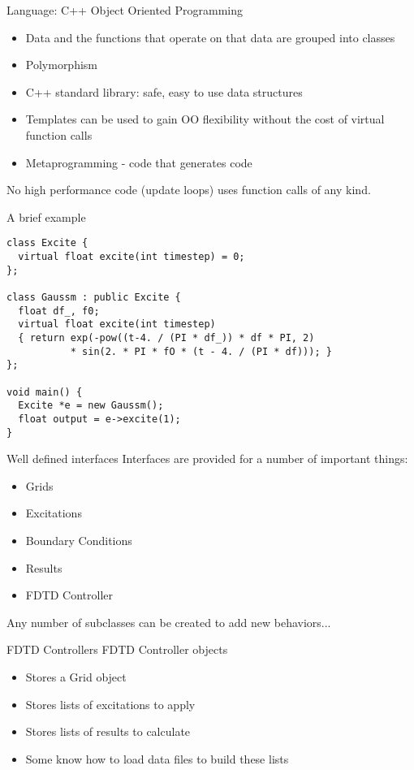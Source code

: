 \documentclass[pdf, nototal, slideBW]{prosper}
\newcommand{\insgraphic}[2]{
  \begin{center}
    \scalebox{#1}{
      \texttt{[image: \#2]}
    }
  \end{center}
}
\begin{document}
\begin{slide}{Language: C++}
  Object Oriented Programming
  \begin{itemize}
  \item Data and the functions that operate on that data are
    grouped into classes
  \item Polymorphism
  \item C++ standard library: safe, easy to use data structures
  \item Templates can be used to gain OO flexibility without the cost
    of virtual function calls
  \item Metaprogramming - code that generates code
  \end{itemize}  
  No high performance code (update loops) uses function calls of any
  kind. 
\end{slide}

\begin{slide}{A brief example}
\tiny
\begin{verbatim}
class Excite {
  virtual float excite(int timestep) = 0;
};

class Gaussm : public Excite {
  float df_, f0;
  virtual float excite(int timestep) 
  { return exp(-pow((t-4. / (PI * df_)) * df * PI, 2)
           * sin(2. * PI * fO * (t - 4. / (PI * df))); }
};

void main() {
  Excite *e = new Gaussm();
  float output = e->excite(1);
}
\end{verbatim}
\end{slide}

\begin{slide}{Well defined interfaces}
  Interfaces are provided for a number of important things:
  \begin{itemize}
  \item Grids
  \item Excitations
  \item Boundary Conditions
  \item Results
  \item FDTD Controller 
  \end{itemize}
  
  Any number of subclasses can be created to add new behaviors...
\end{slide}

\begin{slide}{FDTD Controllers}
  FDTD Controller objects
  \begin{itemize}
  \item Stores a Grid object
  \item Stores lists of excitations to apply
  \item Stores lists of results to calculate
  \item Some know how to load data files to build these lists
  \end{itemize}

  \insgraphic{1}{fdtd-classes.eps}
  
\end{slide}
\end{document}
